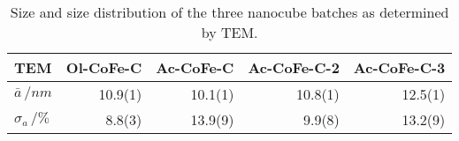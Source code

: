 \documentclass[\main/dresen_thesis.tex]{subfiles}
\begin{document}
  \begin{table}[ht]
    \centering
    \caption{\label{tab:monolayers:nanoparticles:discussion:tem}Size and size distribution of the three nanocube batches as determined by TEM.}
    \begin{tabular}{ l | r | r | r | r}
      \textbf{TEM} & \textbf{Ol-CoFe-C} & \textbf{Ac-CoFe-C} & \textbf{Ac-CoFe-C-2} & \textbf{Ac-CoFe-C-3}\\
      \hline
      $\bar{a} \, / \unit{nm}$    & 10.9(1) & 10.1(1) & 10.8(1) & 12.5(1)\\
      $\sigma_{a}\, / \unit{\%}$  & 8.8(3)  & 13.9(9) & 9.9(8)  & 13.2(9) \\
      \hline
    \end{tabular}
  \end{table}
\end{document}
